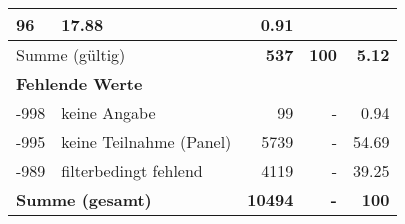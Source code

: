 \begin{longtable}{lXrrr}
       \num{96} &
       \num[round-mode=places,round-precision=2]{17.88} &
         \num[round-mode=places,round-precision=2]{0.91} \\
     \midrule
     \multicolumn{2}{l}{Summe (gültig)} &
       \textbf{\num{537}} &
     \textbf{\num{100}} &
       \textbf{\num[round-mode=places,round-precision=2]{5.12}} \\
     \multicolumn{5}{l}{\textbf{Fehlende Werte}}\\
       -998 &
       keine Angabe &
         \num{99} &
        - &
         \num[round-mode=places,round-precision=2]{0.94} \\
       -995 &
       keine Teilnahme (Panel) &
         \num{5739} &
        - &
         \num[round-mode=places,round-precision=2]{54.69} \\
       -989 &
       filterbedingt fehlend &
         \num{4119} &
        - &
         \num[round-mode=places,round-precision=2]{39.25} \\
     \midrule
     \multicolumn{2}{l}{\textbf{Summe (gesamt)}} &
          \textbf{\num{10494}} &
        \textbf{-} &
        \textbf{\num{100}} \\
     \bottomrule
     \end{longtable}
     
